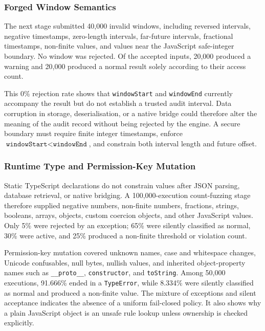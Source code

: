\subsubsection{Forged Window Semantics}

The next stage submitted 40,000 invalid windows, including reversed intervals, negative timestamps, zero-length intervals, far-future intervals, fractional timestamps, non-finite values, and values near the JavaScript safe-integer boundary. No window was rejected. Of the accepted inputs, 20,000 produced a warning and 20,000 produced a normal result solely according to their access count.

This 0\% rejection rate shows that \texttt{windowStart} and \texttt{windowEnd} currently accompany the result but do not establish a trusted audit interval. Data corruption in storage, deserialisation, or a native bridge could therefore alter the meaning of the audit record without being rejected by the engine. A secure boundary must require finite integer timestamps, enforce \(\texttt{windowStart}<\texttt{windowEnd}\), and constrain both interval length and future offset.

\subsubsection{Runtime Type and Permission-Key Mutation}

Static TypeScript declarations do not constrain values after JSON parsing, database retrieval, or native bridging. A 100,000-execution count-fuzzing stage therefore supplied negative numbers, non-finite numbers, fractions, strings, booleans, arrays, objects, custom coercion objects, and other JavaScript values. Only 5\% were rejected by an exception; 65\% were silently classified as normal, 30\% were active, and 25\% produced a non-finite threshold or violation count.

Permission-key mutation covered unknown names, case and whitespace changes, Unicode confusables, null bytes, nullish values, and inherited object-property names such as \texttt{\_\_proto\_\_}, \texttt{constructor}, and \texttt{toString}. Among 50,000 executions, 91.666\% ended in a \texttt{TypeError}, while 8.334\% were silently classified as normal and produced a non-finite value. The mixture of exceptions and silent acceptance indicates the absence of a uniform fail-closed policy. It also shows why a plain JavaScript object is an unsafe rule lookup unless ownership is checked explicitly.

